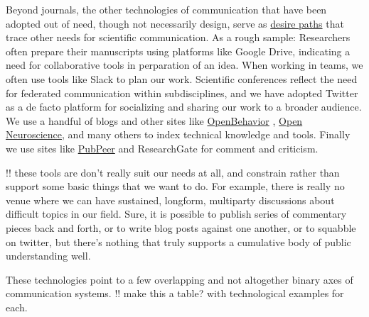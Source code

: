 \documentclass[notoc]{tufte-book}
\begin{document}
Beyond journals, the other technologies of communication that have been
adopted out of need, though not necessarily design, serve as
\href{https://en.wikipedia.org/wiki/Desire_path}{desire paths} that
trace other needs for scientific communication. As a rough sample:
Researchers often prepare their manuscripts using platforms like Google
Drive, indicating a need for collaborative tools in perparation of an
idea. When working in teams, we often use tools like Slack to plan our
work. Scientific conferences reflect the need for federated
communication within subdisciplines, and we have adopted Twitter as a de
facto platform for socializing and sharing our work to a broader
audience. We use a handful of blogs and other sites like
\href{https://edspace.american.edu/openbehavior/}{OpenBehavior} \citep{whiteFutureOpenOpenSource2019} ,
\href{https://open-neuroscience.com/}{Open Neuroscience}, and many
others to index technical knowledge and tools. Finally we use sites like
\href{https://pubpeer.com}{PubPeer} and ResearchGate for comment and
criticism.

!! these tools are don't really suit our needs at all, and constrain
rather than support some basic things that we want to do. For example,
there is really no venue where we can have sustained, longform,
multiparty discussions about difficult topics in our field. Sure, it is
possible to publish series of commentary pieces back and forth, or to
write blog posts against one another, or to squabble on twitter, but
there's nothing that truly supports a cumulative body of public
understanding well.

These technologies point to a few overlapping and not altogether binary
axes of communication systems. !! make this a table? with technological
examples for each.
\end{document}
